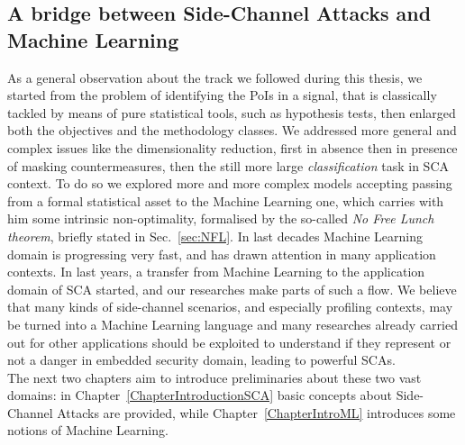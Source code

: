 \subsection{A bridge between Side-Channel Attacks and Machine Learning}
As a general observation about the track we followed during this thesis, we started from the problem of identifying the PoIs in a signal, that is classically tackled by means of pure statistical tools, such as hypothesis tests,  then enlarged both the objectives and the methodology classes. We addressed more general and complex issues like the dimensionality reduction, first in absence then in presence of masking countermeasures, then the still more large \emph{classification} task in SCA context. To do so we explored more and more complex models accepting passing from a formal statistical asset to the Machine Learning one, which carries with him some intrinsic non-optimality, formalised by the so-called \emph{No Free Lunch theorem}, briefly stated in Sec.~\ref{sec:NFL}. In last decades Machine Learning domain is progressing very fast, and has drawn attention in many application contexts. In last years, a transfer from Machine Learning to the application domain of SCA started, and our researches make parts of such a flow. We believe that many kinds of side-channel scenarios, and especially profiling contexts, may be turned into a Machine Learning language and many researches already carried out for other applications should be exploited to understand if they represent or not a danger in embedded security domain, leading to powerful SCAs. \\

The next two chapters aim to introduce preliminaries about these two vast domains: in Chapter~\ref{ChapterIntroductionSCA} basic concepts about Side-Channel Attacks are provided, while Chapter~\ref{ChapterIntroML} introduces some notions of Machine Learning.
